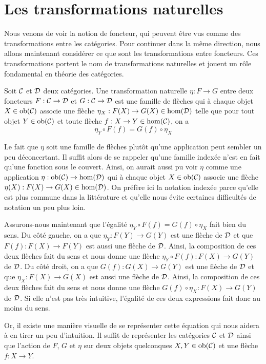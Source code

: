 \section{Les transformations naturelles}
Nous venons de voir la notion de foncteur, qui peuvent être vus comme
des transformations entre les catégories. Pour continuer dans la même
direction, nous allons maintenant considérer ce que sont les transformations
entre foncteurs. Ces transformations portent le nom de transformations
naturelles et jouent un rôle fondamental en théorie des catégories.

\begin{définition}
    Soit $\mathcal{C}$ et $\mathcal{D}$ deux catégories. Une transformation naturelle
    $\eta : F \to G$ entre deux foncteurs $F : \mathcal{C} \to \mathcal{D}$ et $G : \mathcal{C} \to \mathcal{D}$
    est une famille de flèches qui à chaque objet $X \in \mathrm{ob}(\mathcal{C})$ associe une
    flèche $\eta_X : F(X) \to G(X) \in \hom(\mathcal{D})$ telle que pour tout objet
    $Y \in \mathrm{ob}(\mathcal{C})$ et toute flèche $f : X \to Y \in \hom(\mathcal{C})$, on a
    \[
        \eta_Y \circ F(f) = G(f) \circ \eta_X
    \]
\end{définition}

Le fait que $\eta$ soit une famille de flèches plutôt qu'une application
peut sembler un peu déconcertant. Il suffit alors de se rappeler qu'une
famille indexée n'est en fait qu'une fonction sous le couvert. Ainsi, on
aurait aussi pu voir $\eta$ comme une application $\eta : \mathrm{ob}(\mathcal{C}) \to \hom(\mathcal{D})$
qui à chaque objet $X \in \mathrm{ob}(\mathcal{C})$ associe une flèche
$\eta(X) : F(X) \to G(X) \in \hom(\mathcal{D})$. On préfère ici la notation indexée
parce qu'elle est plus commune dans la littérature et qu'elle nous évite
certaines difficultés de notation un peu plus loin.

Assurons-nous maintenant que l'égalité $\eta_Y \circ F(f) = G(f) \circ \eta_X$
fait bien du sens. Du côté gauche, on a que $\eta_Y : F(Y) \to G(Y)$ est une
flèche de $\mathcal{D}$ et que $F(f) : F(X) \to F(Y)$ est aussi une flèche de $\mathcal{D}$.
Ainsi, la composition de ces deux flèches fait du sens et nous donne une flèche
$\eta_Y \circ F(f) : F(X) \to G(Y)$ de $\mathcal{D}$. Du côté droit, on a que
$G(f) : G(X) \to G(Y)$ est une flèche de $\mathcal{D}$ et que $\eta_X : F(X) \to G(X)$
est aussi une flèche de $\mathcal{D}$. Ainsi, la composition de ces deux flèches fait
du sens et nous donne une flèche $G(f) \circ \eta_X : F(X) \to G(Y)$ de $\mathcal{D}$.
Si elle n'est pas très intuitive, l'égalité de ces deux expressions fait donc
au moins du sens.

Or, il existe une manière visuelle de se représenter cette équation qui nous
aidera à en tirer un peu d'intuition. Il suffit de représenter les catégories
$\mathcal{C}$ et $\mathcal{D}$ ainsi que l'action de $F$, $G$ et $\eta$ sur deux objets
quelconques $X,Y \in \mathrm{ob}(\mathcal{C})$ et une flèche $f : X \to Y$.

